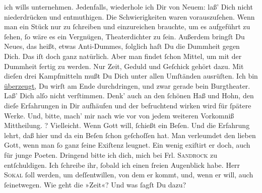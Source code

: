 \begin{ledgroupsized}[t]{13cm}
               ich wills unternehmen. Jedenfalls, wiederhole ich Dir von Neuem: laß’ Dich nicht
               niederdrücken und entmuthigen. Die Schwierigkeiten waren vorauszuſehen. Wenn man ein
               Stück nur zu ſchreiben und einzureichen brauchte, um es aufgeführt zu ſehen, ſo wäre
               es ein Vergnügen, Theaterdichter zu ſein. Außerdem bringſt Du Neues, das heißt, etwas
               Anti-Dummes, folglich haſt Du die Dummheit gegen Dich. Das iſt doch ganz natürlich.
               Aber man findet ſchon Mittel, {\pb}um mit der Dummheit
               fertig zu werden. Nur Zeit, Geduld und Geſchick gehört dazu. Mit dieſen drei
               Kampfmitteln \strikeout{\textcolor{gray}{we}} mußt Du Dich unter
               allen Umſtänden ausrüſten. Ich bin \uline{überzeugt}, Du
               wirſt am Ende durchdringen, und zwar gerade bein Burgtheater. Laß’ Dich alſo nicht verſtimmen. Denk’ auch an den ſchönen Haß
               und Hohn, den dieſe Erfahrungen in Dir aufhäufen und der befruchtend wirken wird für
                   ſpätere Werke. Und, bitte, mach’ mir nach wie
               vor von jedem weiteren Vorkomniß Mittheilung. \label{K_L02622-2v}\label{K_L02622-2h}? {\pb}Vielleicht. Wenn Gott will, ſchießt ein Beſen. Und
               die Erfahrung lehrt, daß hier und da ein Beſen ſchon geſchoſſen hat. Man  verleumdet den lieben Gott, wenn man ſo ganz ſeine
               Exiſtenz leugnet. Ein wenig exiſtirt er doch, auch für junge Poeten.\pend
           \pstart
           Dringend bitte ich dich, mich bei Frl. \textsc{Sandrock} zu entſchuldigen. Ich ſchreibe ihr, ſobald ich
               einen ſreien Augenblick habe.\pend
           \pstart
           Herr \textsc{Sokal} ſoll \label{K_L02622-3v}\label{K_L02622-3h} werden, {\pb}um
               deſſentwillen, von dem er kommt, und, wenn er will, auch ſeinetwegen.\pend
           \pstart
           Wie geht die »Zeit«? Und was ſagſt Du dazu?\pend

\end{ledgroupsized}
